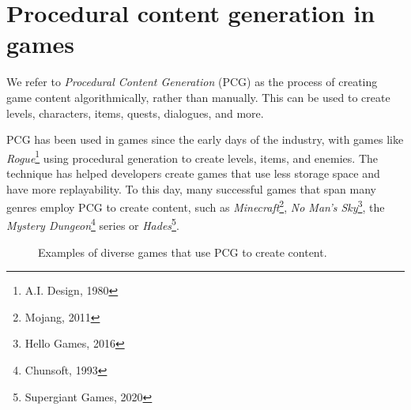 \documentclass{Configuration_Files/PoliMi3i_thesis}
\begin{document}
\section{Procedural content generation in games}
We refer to \textit{Procedural Content Generation} (PCG) as the process of creating game content algorithmically, rather than manually. This can be used to create levels, characters, items, quests, dialogues, and more. 

PCG has been used in games since the early days of the industry, with games like \textit{Rogue}\footnote{A.I. Design, 1980} using procedural generation to create levels, items, and enemies. The technique has helped developers create games that use less storage space and have more replayability. To this day, many successful games that span many genres employ PCG to create content, such as \textit{Minecraft}\footnote{Mojang, 2011}, \textit{No Man's Sky}\footnote{Hello Games, 2016}, the \textit{Mystery Dungeon}\footnote{Chunsoft, 1993} series or \textit{Hades}\footnote{Supergiant Games, 2020}.

\begin{figure}[H]
    \centering
    \caption[PCG Games]{Examples of diverse games that use PCG to create content.}
    \label{fig:pcg_games}
\end{figure}
\end{document}
